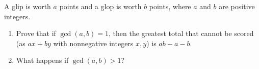 A glip is worth $a$ points and a glop is worth $b$ points, where $a$ and $b$ are positive integers.
\begin{enumerate}
\item[(a)] Prove that if $\gcd(a,b)=1$, then the greatest total that cannot be scored (as $ax+by$ with nonnegative integers $x,y$) is $ab-a-b$.
\item[(b)] What happens if $\gcd(a,b)>1$?
\end{enumerate}
